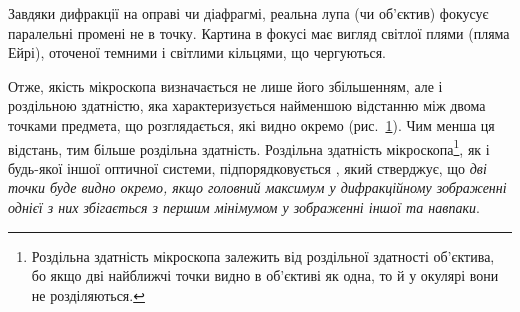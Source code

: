 
Завдяки дифракції на оправі чи діафрагмі, реальна лупа (чи об'єктив) фокусує паралельні промені не в точку. Картина в фокусі має вигляд світлої плями (пляма Ейрі), оточеної темними і світлими кільцями, що чергуються.

Отже, якість мікроскопа визначається не лише його збільшенням, але і роздільною здатністю, яка характеризується найменшою відстанню між двома точками предмета, що розглядається, які видно окремо (рис.~\ref{pic:lupa_resolution}). Чим менша ця відстань, тим більше роздільна здатність.  Роздільна здатність мікроскопа\footnote{Роздільна здатність мікроскопа залежить від роздільної здатності об'єктива, бо якщо дві найближчі точки видно в об'єктиві як одна, то й у окулярі вони не розділяються.}, як і будь-якої іншої оптичної системи, підпорядковується , який стверджує, що \emph{дві точки буде видно окремо, якщо головний максимум у дифракційному зображенні однієї з них збігається з першим мінімумом у зображенні іншої та навпаки}.


\begin{figure}[ht!]\centering
    
    \caption{}
    \label{pic:lupa_resolution}
\end{figure}

